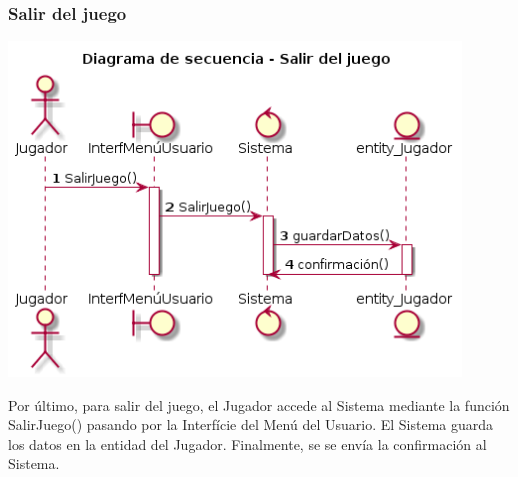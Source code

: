 \subsubsection{Salir del juego}
\begin{center}
  \includegraphics[width=0.9\textwidth]{./imatges/jugador/Salir_del_juego.png}
  \end{center}
  Por último, para salir del juego, el Jugador accede al Sistema mediante la función SalirJuego() pasando por la Interfície del Menú del Usuario. El Sistema guarda los datos en la entidad del Jugador. Finalmente, se se envía la confirmación al Sistema.

